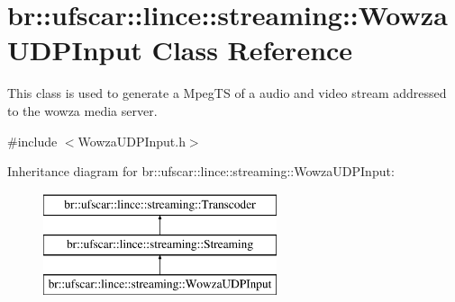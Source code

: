 \hypertarget{classbr_1_1ufscar_1_1lince_1_1streaming_1_1WowzaUDPInput}{
\section{br::ufscar::lince::streaming::WowzaUDPInput Class Reference}
\label{classbr_1_1ufscar_1_1lince_1_1streaming_1_1WowzaUDPInput}
}


This class is used to generate a MpegTS of a audio and video stream addressed to the wowza media server.  




{\ttfamily \#include $<$WowzaUDPInput.h$>$}

Inheritance diagram for br::ufscar::lince::streaming::WowzaUDPInput:\begin{figure}[H]
\begin{center}
\leavevmode
\includegraphics[height=3cm]{classbr_1_1ufscar_1_1lince_1_1streaming_1_1WowzaUDPInput}
\end{center}
\end{figure}
